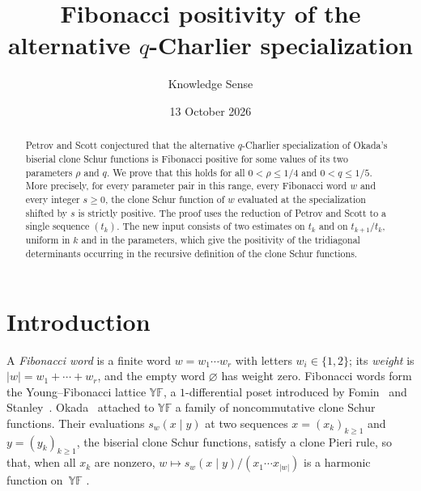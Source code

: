 \documentclass[11pt]{amsart}
\theoremstyle{definition}
\theoremstyle{remark}
\numberwithin{equation}{section}
\newcommand{\YF}{\mathbb{YF}}
\begin{document}
\title[The alternative $q$-Charlier specialization]{Fibonacci positivity of the alternative $q$-Charlier specialization}

\author{Knowledge Sense}

\date{13 October 2026}



\begin{abstract}
Petrov and Scott conjectured that the alternative $q$-Charlier specialization of Okada's biserial clone Schur functions is Fibonacci positive for some values of its two parameters $\rho$ and $q$. We prove that this holds for all $0<\rho\le 1/4$ and $0<q\le 1/5$. More precisely, for every parameter pair in this range, every Fibonacci word $w$ and every integer $s\ge0$, the clone Schur function of $w$ evaluated at the specialization shifted by $s$ is strictly positive. The proof uses the reduction of Petrov and Scott to a single sequence $(t_k)$. The new input consists of two estimates on $t_k$ and on $t_{k+1}/t_k$, uniform in $k$ and in the parameters, which give the positivity of the tridiagonal determinants occurring in the recursive definition of the clone Schur functions.
\end{abstract}

\maketitle

\section{Introduction}

A \emph{Fibonacci word} is a finite word $w=w_1\cdots w_r$ with letters $w_i\in\{1,2\}$; its \emph{weight} is $|w|=w_1+\cdots+w_r$, and the empty word $\varnothing$ has weight zero. Fibonacci words form the Young--Fibonacci lattice $\YF$, a $1$-differential poset introduced by Fomin~\cite{Fom88} and Stanley~\cite{Sta88}. Okada~\cite{Oka94} attached to $\YF$ a family of noncommutative clone Schur functions. Their evaluations $s_w(x\mid y)$ at two sequences $x=(x_k)_{k\ge1}$ and $y=(y_k)_{k\ge1}$, the biserial clone Schur functions, satisfy a clone Pieri rule, so that, when all $x_k$ are nonzero, $w\mapsto s_w(x\mid y)/(x_1\cdots x_{|w|})$ is a harmonic function on~$\YF$ \cite[Proposition~2.6]{PS26}.
\end{document}
